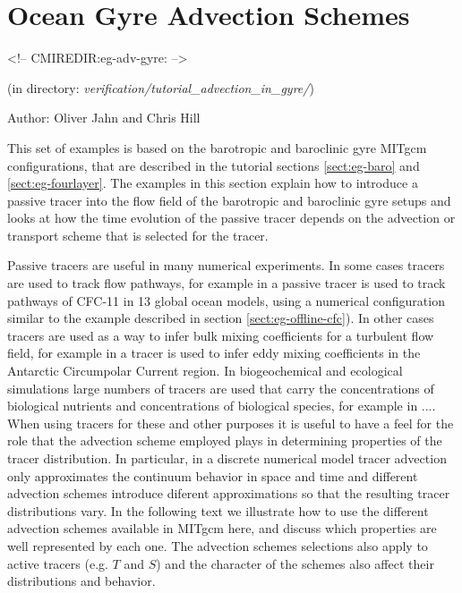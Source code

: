 


\section[Gyre Advection Example]{Ocean Gyre Advection Schemes}
\label{www:tutorials}
\label{sect:eg-adv-gyre}
\begin{rawhtml}
<!-- CMIREDIR:eg-adv-gyre: -->
\end{rawhtml}
\begin{center} 
(in directory: {\it verification/tutorial\_advection\_in\_gyre/})
\end{center}

Author: Oliver Jahn and Chris Hill



This set of examples is based on the barotropic and baroclinic gyre MITgcm configurations,
that are described in the tutorial sections \ref{sect:eg-baro} and \ref{sect:eg-fourlayer}. 
The examples in this section explain how to introduce a passive tracer into the flow 
field of the barotropic and baroclinic gyre setups and looks at how the time evolution
of the passive tracer depends on the advection or transport scheme that is selected 
for the tracer. 

Passive tracers are useful in many numerical experiments. In some cases tracers are
used to track flow pathways, for example in \cite{Dutay02} a passive tracer is used
to track pathways of CFC-11 in 13 global ocean models, using a numerical
configuration similar to the example described in section \ref{sect:eg-offline-cfc}).
In other cases tracers are used as a way
to infer bulk mixing coefficients for a turbulent flow field, for example in 
\cite{marsh06} a tracer is used to infer eddy mixing coefficients in the
Antarctic Circumpolar Current region. In biogeochemical and ecological simulations large numbers 
of tracers are used that carry the concentrations of biological nutrients and concentrations of 
biological species, for example in ....
When using tracers for these and other purposes it is useful to have a feel for the role
that the advection scheme employed plays in determining properties of the tracer distribution.
In particular, in a discrete numerical model tracer advection only approximates the 
continuum behavior in space and time and different advection schemes introduce diferent 
approximations so that the resulting tracer distributions vary. In the following 
text we illustrate how
to use the different advection schemes available in MITgcm here, and discuss which properties 
are well represented by each one. The advection schemes selections also apply to active
tracers (e.g. $T$ and $S$) and the character of the schemes also affect their distributions
and behavior.

